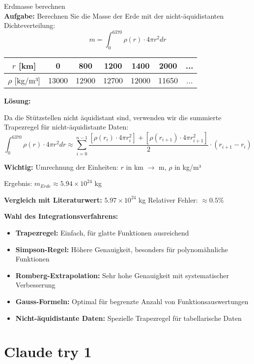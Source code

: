 \begin{example2}{Erdmasse berechnen}\\
\textbf{Aufgabe:} Berechnen Sie die Masse der Erde mit der nicht-äquidistanten Dichteverteilung:
$$m = \int_0^{6370} \rho(r) \cdot 4\pi r^2 dr$$

\begin{center}
\begin{tabular}{|c|c|c|c|c|c|c|}
\hline
$r$ [km] & 0 & 800 & 1200 & 1400 & 2000 & ... \\
\hline
$\rho$ [kg/m³] & 13000 & 12900 & 12700 & 12000 & 11650 & ... \\
\hline
\end{tabular}
\end{center}
\tcblower
\textbf{Lösung:}

Da die Stützstellen nicht äquidistant sind, verwenden wir die summierte Trapezregel für nicht-äquidistante Daten:
$$\int_0^{6370} \rho(r) \cdot 4\pi r^2 dr \approx \sum_{i=0}^{n-1} \frac{[\rho(r_i) \cdot 4\pi r_i^2] + [\rho(r_{i+1}) \cdot 4\pi r_{i+1}^2]}{2} \cdot (r_{i+1} - r_i)$$

\textbf{Wichtig:} Umrechnung der Einheiten: $r$ in km $\rightarrow$ m, $\rho$ in kg/m³

Ergebnis: $m_{Erde} \approx 5.94 \times 10^{24}$ kg

\textbf{Vergleich mit Literaturwert:} $5.97 \times 10^{24}$ kg
Relativer Fehler: $\approx 0.5\%$
\end{example2}

\begin{remark}
\textbf{Wahl des Integrationsverfahrens:}
\begin{itemize}
    \item \textbf{Trapezregel:} Einfach, für glatte Funktionen ausreichend
    \item \textbf{Simpson-Regel:} Höhere Genauigkeit, besonders für polynomähnliche Funktionen
    \item \textbf{Romberg-Extrapolation:} Sehr hohe Genauigkeit mit systematischer Verbesserung
    \item \textbf{Gauss-Formeln:} Optimal für begrenzte Anzahl von Funktionsauswertungen
    \item \textbf{Nicht-äquidistante Daten:} Spezielle Trapezregel für tabellarische Daten
\end{itemize}
\end{remark}

\section{Claude try 1}

